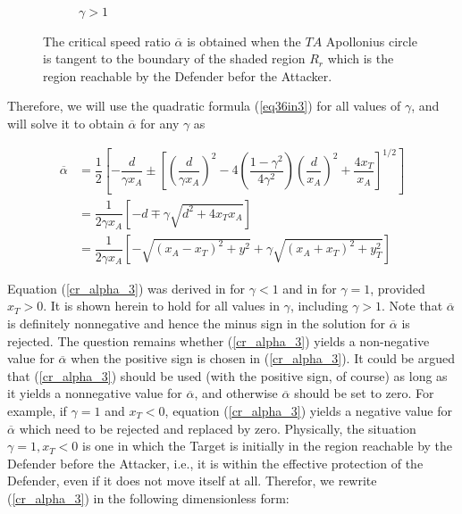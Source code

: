 \documentclass[final,5p,times,twocolumn]{elsarticle}
\begin{document}
\begin{figure}
\begin{subfigure}[b]{0.3\textwidth}
\caption {$\gamma>1$}
\label{4_g>1}
\end{subfigure}

\caption{The critical speed ratio $\overline{\alpha}$ is obtained when the $TA$ Apollonius circle is tangent to the boundary of the shaded region $R_r$ which is the region reachable by the Defender befor the Attacker.}
\label{CSR}
\end{figure}


Therefore, we will use the quadratic formula (\ref{eq36in3}) for all values of $\gamma$, and will solve it to obtain $\overline{\alpha}$ for any $\gamma$ as 

\begin{equation}
\begin{split}
\overline{\alpha}&=\dfrac{1}{2}[-\dfrac{d}{\gamma x_{A}}
\pm[(\dfrac{d}{\gamma x_{A}})^{2}-4(\dfrac{1-\gamma^{2}}{4\gamma^{2}})(\dfrac{d}{x_{A}})^{2}+\dfrac{4x_{T}}{x_{A}}]^{1/2} ]\\
&= \dfrac{1}{2\gamma x_{A}} [-d \mp \gamma \sqrt{d^{2}+4 x_{T} x_{A}}]\\
&= \dfrac{1}{2 \gamma x_{A}} [- \sqrt{(x_{A}-x_{T})^{2} + y^{2}}+ \gamma \sqrt{(x_{A}+ x_{T})^{2}+y_{T}^{2}}]
\end{split}
\label{cr_alpha_3}
\end{equation}






Equation (\ref{cr_alpha_3}) was derived in \cite{garcia2015escape} for $\gamma<1$ and in \cite{pachter2014active} for $\gamma=1$, provided $x_{T}>0$. It is shown herein to hold for all values in $\gamma$, including $\gamma>1$. Note that $\overline{\alpha}$ is definitely nonnegative and hence the minus sign in the solution for $\overline{\alpha}$ is rejected. The question remains whether (\ref{cr_alpha_3}) yields a non-negative value for $\overline{\alpha}$ when the positive sign is chosen in (\ref{cr_alpha_3}). It could be argued that (\ref{cr_alpha_3}) should be used (with the positive sign, of course) as long as it yields a nonnegative value for  $\overline{\alpha}$, and otherwise  $\overline{\alpha}$ should be set to zero. For example, if $\gamma=1$ and $x_T<0$, equation (\ref{cr_alpha_3}) yields a negative value for $\overline{\alpha}$ which need to be rejected and replaced by zero. Physically, the situation ${\gamma=1, x_T<0}$ is one in which the Target is initially in the region reachable by the Defender before the Attacker, i.e., it is within the effective protection of the Defender, even if it does not move itself at all. Therefor, we rewrite (\ref{cr_alpha_3}) in the following dimensionless form:
\end{document}

